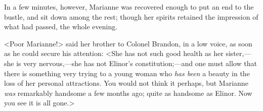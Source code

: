 In a few minutes, however, Marianne was recovered enough to put an end to the bustle, and sit down among the rest; though her spirits retained the impression of what had passed, the whole evening.

<Poor Marianne!> said her brother to Colonel Brandon, in a low voice, as soon as he could secure his attention: <She has not such good health as her sister,—she is very nervous,—she has not Elinor's constitution;—and one must allow that there is something very trying to a young woman who \textit{has been} a beauty in the loss of her personal attractions. You would not think it perhaps, but Marianne \textit{was} remarkably handsome a few months ago; quite as handsome as Elinor. Now you see it is all gone.>